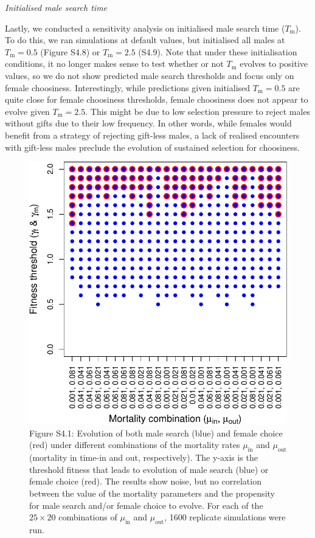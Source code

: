 \documentclass[
]{article}
\begin{document}
\emph{Initialised male search time}

Lastly, we conducted a sensitivity analysis on initialised male search
time (\(T_{\mathrm{m}}\)). To do this, we ran simulations at default
values, but initialised all males at \(T_{\mathrm{m}} = 0.5\) (Figure
S4.8) or \(T_{\mathrm{m}} = 2.5\) (S4.9). Note that under these
initialisation conditions, it no longer makes sense to test whether or
not \(T_{\mathrm{m}}\) evolves to positive values, so we do not show
predicted male search thresholds and focus only on female choosiness.
Interestingly, while predictions given initialised
\(T_{\mathrm{m}} = 0.5\) are quite close for female choosiness
thresholds, female choosiness does not appear to evolve given
\(T_{\mathrm{m}} = 2.5\). This might be due to low selection pressure to
reject males without gifts due to their low frequency. In other words,
while females would benefit from a strategy of rejecting gift-less
males, a lack of realised encounters with gift-less males preclude the
evolution of sustained selection for choosiness.

\clearpage

\captionsetup{labelformat=empty}

\begin{figure}
\centering
\includegraphics{ms_refs_fixed_files/figure-latex/unnamed-chunk-6-1.pdf}
\caption{Figure S4.1: Evolution of both male search (blue) and female
choice (red) under different combinations of the mortality rates
\(\mu_{\mathrm{in}}\) and \(\mu_{\mathrm{out}}\) (mortality in time-in
and out, respectively). The y-axis is the threshold fitness that leads
to evolution of male search (blue) or female choice (red). The results
show noise, but no correlation between the value of the mortality
parameters and the propensity for male search and/or female choice to
evolve. For each of the \(25 \times 20\) combinations of
\(\mu_{\mathrm{in}}\) and \(\mu_{\mathrm{out}}\), 1600 replicate
simulations were run.}
\end{figure}
\end{document}
